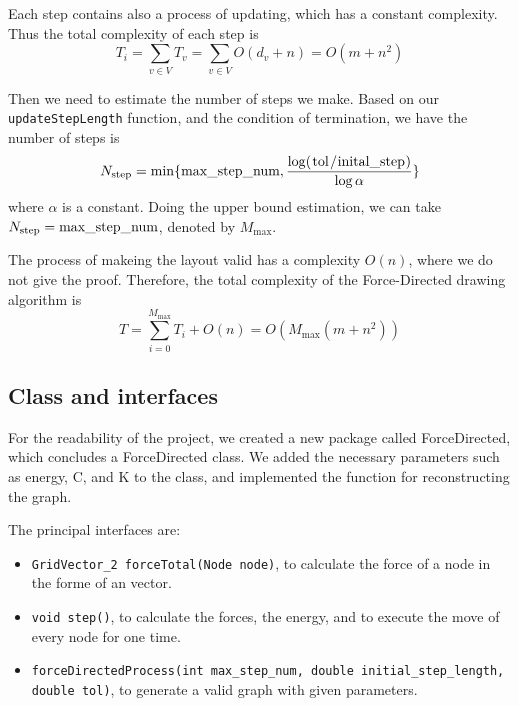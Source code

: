 Each step contains also a process of updating, which has a constant complexity. Thus the total complexity of each step is 
$$T_i = \sum_{v\in V} T_v = \sum_{v\in V} O(d_v + n) = O(m + n^2)$$

Then we need to estimate the number of steps we make. Based on our \lstinline{updateStepLength} function, and the condition of termination, we have the number of steps is 
$$N_{\text{step}} = \min\{\lstinline{max_step_num}, \frac{\log(\lstinline{tol/inital_step})}{\log \alpha}\}$$
where $\alpha$ is a constant. Doing the upper bound estimation, we can take $N_{\text{step}} = \lstinline{max_step_num}$, denoted by $M_\max$.

The process of makeing the layout valid has a complexity $O(n)$, where we do not give the proof. Therefore, the total complexity of the Force-Directed drawing algorithm is 
$$T = \sum_{i=0}^{M_{\max}}T_i + O(n) = O(M_{\max}(m+n^2))$$

\subsection{Class and interfaces}

For the readability of the project, we created a new package called ForceDirected, which concludes a ForceDirected class. We added the necessary parameters such as energy, C, and K to the class, and implemented the function for reconstructing the graph.

The principal interfaces are:
\begin{itemize}
    \item \lstinline{GridVector_2 forceTotal(Node node)}, to calculate the force of a node in the forme of an vector.
    \item \lstinline{void step()}, to calculate the forces, the energy, and to execute the move of every node for one time.
    \item \lstinline{forceDirectedProcess(int max_step_num, double initial_step_length, double tol)}, to generate a valid graph with given parameters.
\end{itemize}
\quad
